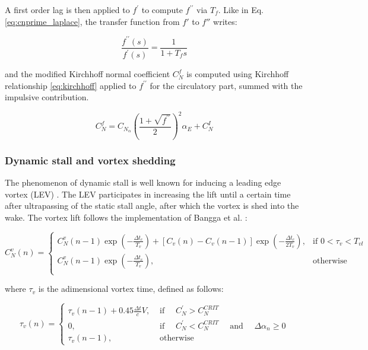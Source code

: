 A first order lag is then applied to $f^{\prime}$ to compute $f^{\prime \prime}$ via $T_f$. Like in Eq. \eqref{eq:cnprime_laplace}, the transfer function from $f'$ to $f''$ writes:

\begin{equation}
\frac{f^{\prime \prime}(s)}{f^{\prime} (s)} = \frac{1}{1 + T_f s}
\end{equation}

\noindent and the modified Kirchhoff normal coefficient $C_N^f$ is computed using Kirchhoff relationship \eqref{eq:kirchhoff} applied to $f^{\prime \prime}$ for the circulatory part, summed with the impulsive contribution.

\begin{equation}
	C_{N}^{f}=C_{N_{\alpha}}\left(\frac{1+\sqrt{f^{\prime \prime}}}{2}\right)^{2} \alpha_{E}+C_{N}^{I}\label{eq:mod_kirchoff}
\end{equation}

\subsubsection{Dynamic stall and vortex shedding}

The phenomenon of dynamic stall is well known for inducing a leading edge vortex (LEV) \cite{mccroskey_dynamic_1976,mulleners_onset_2010,mulleners_dynamic_2013}. The LEV participates in increasing the lift until a certain time after ultrapassing of the static stall angle, after which the vortex is shed into the wake. The vortex lift follows the implementation of Bangga et al. \cite{bangga_improved_2020}:

\begin{equation}
	C_{N}^{v}(n)=
	\begin{cases}
		C_{N}^{v}(n-1) \exp \left(-\frac{\Delta t_c}{T_{v}}\right)+\left[C_{v}(n)-C_{v}(n-1)\right] \exp \left(-\frac{\Delta t_c}{2 T_{v}}\right), & \text{if } 0<\tau_v<T_{vl} \\
		C_{N}^{v}(n-1) \exp \left(-\frac{\Delta t_c}{T_{v}}\right), & \text{otherwise} \\
	\end{cases}	
	\label{eq:vortex_lift}
\end{equation}

\noindent where $\tau_v$ is the adimensional vortex time, defined as follows: 

\begin{equation}
	\tau_{v}(n)=\left\{\begin{array}{ll}
		\tau_{v}(n-1)+0.45 \frac{\Delta t}{c} V, & \text { if } \quad C_N^{\prime}>C_{N}^{CRIT} \\
		0, & \text { if } \quad C_N^{\prime}<C_{N}^{CRIT} \quad \text { and } \quad \Delta \alpha_{n} \geq 0 \\
		\tau_{v}(n-1), & \text { otherwise }
		\end{array}\right.
	\label{eq:adim_vortex_time}	
\end{equation}

